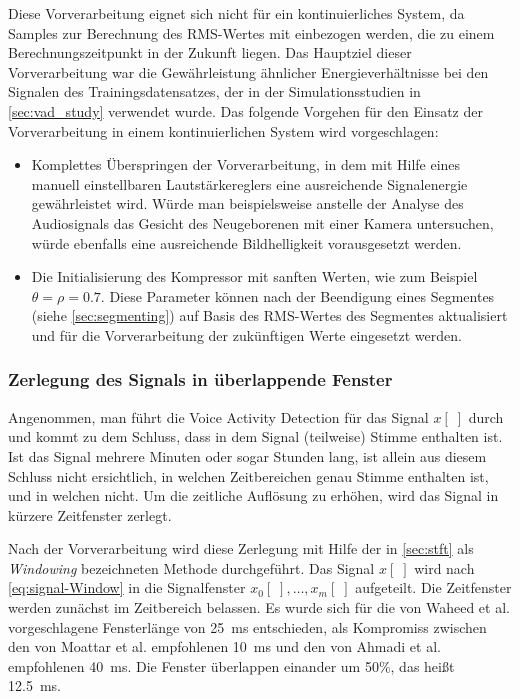Diese Vorverarbeitung eignet sich nicht für ein kontinuierliches System, da Samples zur Berechnung des RMS-Wertes mit einbezogen werden, die zu einem Berechnungszeitpunkt in der Zukunft liegen. Das Hauptziel dieser Vorverarbeitung war die Gewährleistung ähnlicher Energieverhältnisse bei den Signalen des Trainingsdatensatzes, der in der Simulationsstudien in \autoref{sec:vad_study} verwendet wurde. Das folgende Vorgehen für den Einsatz der Vorverarbeitung in einem kontinuierlichen System wird vorgeschlagen:
\begin{itemize}
	\item Komplettes Überspringen der Vorverarbeitung, in dem mit Hilfe eines manuell einstellbaren Lautstärkereglers eine ausreichende Signalenergie gewährleistet wird. Würde man beispielsweise anstelle der Analyse des Audiosignals das Gesicht des Neugeborenen mit einer Kamera untersuchen, würde ebenfalls eine ausreichende Bildhelligkeit vorausgesetzt werden.
	\item Die Initialisierung des Kompressor mit \grqq sanften Werten\grqq , wie zum Beispiel $\theta = \rho = 0.7$. Diese Parameter können nach der Beendigung eines Segmentes (siehe \autoref{sec:segmenting}) auf Basis des RMS-Wertes des Segmentes aktualisiert und für die Vorverarbeitung der zukünftigen Werte eingesetzt werden.
\end{itemize}

\subsubsection{Zerlegung des Signals in überlappende Fenster}
\label{sec:windowing}

Angenommen, man führt die Voice Activity Detection für das Signal $x[\;]$ durch und kommt zu dem Schluss, dass in dem Signal (teilweise) Stimme enthalten ist. Ist das Signal mehrere Minuten oder sogar Stunden lang, ist allein aus diesem Schluss nicht ersichtlich, in welchen Zeitbereichen genau Stimme enthalten ist, und in welchen nicht. Um die zeitliche Auflösung zu erhöhen, wird das Signal in kürzere Zeitfenster zerlegt.

Nach der Vorverarbeitung wird diese Zerlegung mit Hilfe der in \autoref{sec:stft} als \emph{Windowing} bezeichneten Methode durchgeführt. Das Signal $x[\;]$ wird nach \autoref{eq:signal-Window} in die Signalfenster $x_0[\;] , \ldots , x_m[\;]$ aufgeteilt. Die Zeitfenster werden zunächst im Zeitbereich belassen. Es wurde sich für die von Waheed et al. \cite{vad_entropy} vorgeschlagene Fensterlänge von \SI{25}{\milli\second} entschieden, als Kompromiss zwischen den von Moattar et al. \cite{vad_Easy} empfohlenen \SI{10}{\milli\second} und den von Ahmadi et al. \cite{vad_ceps} empfohlenen \SI{40}{\milli\second}. Die Fenster überlappen einander um 50\%, das heißt \SI{12.5}{\milli\second}.

